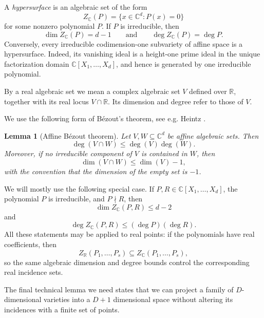 \documentclass[11pt]{article}
\theoremstyle{plain}
\newtheorem{lemma}[theorem]{Lemma}
\theoremstyle{definition}
\begin{document}
	A \emph{hypersurface} is an algebraic set of the form
	\[
	Z_{\mathbb{C}}(P)=\{x\in\mathbb C^d:P(x)=0\}
	\]
	for some nonzero polynomial $P$. If $P$ is irreducible, then
	\[
	\dim Z_{\mathbb{C}}(P)=d-1
	\qquad\text{and}\qquad
	\deg Z_{\mathbb{C}}(P)=\deg P.
	\]
	Conversely, every irreducible codimension-one subvariety of affine
	space is a hypersurface. Indeed, its vanishing ideal is a height-one
	prime ideal in the unique factorization domain
	$\mathbb C[X_1,\ldots,X_d]$, and hence is generated by one
	irreducible polynomial.

    
	By a real algebraic set we mean a complex algebraic set $V$  defined over $\mathbb{R}$, together with its real locus 
	$V\cap \mathbb{R}$. Its dimension and degree refer to those of $V$.
	
	We use the following form of B\'ezout's theorem, see e.g. Heintz \cite{Heintz}.
	
	\begin{lemma}[Affine B\'ezout theorem]\label{lem:bezout}
		Let $V,W\subseteq\mathbb C^d$ be affine algebraic sets. Then
		$$\deg(V\cap W)\leq \deg(V)\deg(W).$$
		Moreover, if no irreducible component of $V$ is contained in $W$, then
		$$\dim(V\cap W)\leq \dim(V)-1,$$
		with the convention that the dimension of the empty set is $-1$.
	\end{lemma}
	
	We will mostly use the following special case. If $P,R\in
	\mathbb C[X_1,\ldots,X_d]$, the polynomial $P$ is irreducible, and
	$P\nmid R$, then
	\[
	\dim Z_{\mathbb{C}}(P,R)\le d-2
	\]
	and
	\[
	\deg Z_{\mathbb{C}}(P,R)\le (\deg P)(\deg R).
	\]
	All these statements may be applied to real points: if the
	polynomials have real coefficients, then
	\[
	Z_{\mathbb R}(P_1,\ldots,P_s)
	\subseteq
	Z_{\mathbb C}(P_1,\ldots,P_s),
	\]
	so the same algebraic dimension and degree bounds control the
	corresponding real incidence sets.
	
	The final technical lemma we need states that we can project a family of $D$-dimensional varieties into a $D+1$ dimensional space without altering its incidences with a finite set of points.
	
\end{document}
